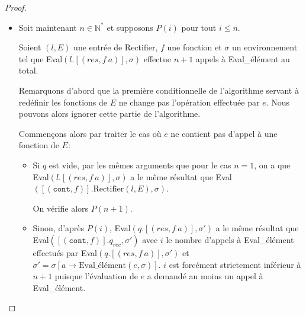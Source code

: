 \begin{proof}
\begin{itemize}
              \bigskip

              Ainsi, Eval$(l.[(res, f\ a)], \sigma)$ a le même résultat que
              Eval$([(\texttt{cont}, f)].\text{Rectifier}(l, E), \sigma)$.
              On vérifie alors $P(1)$.

              \bigskip

        \item Soit maintenant $n \in \mathbb{N}^*$ et supposons $P(i)$ pour tout
              $i \leq n$.

              Soient $(l, E)$ une entrée de Rectifier, $f$ une fonction et
              $\sigma$ un environnement tel que Eval$(l.[(res, f\ a)], \sigma)$
              effectue $n + 1$ appels à Eval\_élément au total.

              \bigskip

              Remarquons d'abord que la première conditionnelle de l'algorithme
              servant à redéfinir les fonctions de $E$ ne change pas l'opération
              effectuée par $e$. Nous pouvons alors ignorer cette partie de
              l'algorithme.

              \bigskip

              Commençons alors par traiter le cas o\`u $e$ ne contient pas
              d'appel à une fonction de $E$:
              \begin{itemize}
                  \item Si $q$ est vide, par les mêmes arguments que pour le cas
                        $n = 1$, on a que Eval$(l.[(res, f\ a)], \sigma)$ a le
                        même résultat que
                        Eval$([(\texttt{cont}, f)].\text{Rectifier}(l, E), \sigma)$.

                        \bigskip

                        On vérifie alors $P(n + 1)$.

                        \bigskip

                  \item Sinon, d'après $P(i)$, Eval$(q.[(res, f\ a)], \sigma')$ a le
                        même résultat que
                        Eval$([(\texttt{cont}, f)].q_{rec}, \sigma')$ avec $i$
                        le nombre d'appels à Eval\_élément effectués par
                        Eval$(q.[(res, f\ a)], \sigma')$ et
                        $\sigma' = \sigma[a \rightarrow \text{Eval\_élément}(e, \sigma)]$.
                        $i$ est forcément strictement inférieur à $n + 1$
                        puisque l'évaluation de $e$ a demandé au moins un appel
                        à Eval\_élément.


\end{itemize}
\end{itemize}
\end{proof}
